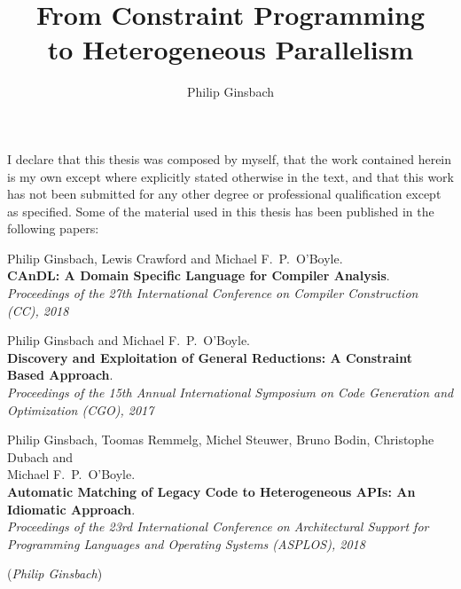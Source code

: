 \documentclass[phd,icsa,twoside,logo,11pt]{infthesis}
\title{From Constraint Programming\\to Heterogeneous Parallelism}
\author{Philip Ginsbach}
\begin{document}
\begin{preliminary}
\maketitle
\begin{acknowledgements}
\end{acknowledgements}
\begin{declaration}
    I declare that this thesis was composed by myself, that the work contained
    herein is my own except where explicitly stated otherwise in the text, and
    that this work has not been submitted for any other degree or professional
    qualification except as specified.
    Some of the material used in this thesis has been published in the following
    papers:

    \begin{description}
    \small
        \item[\hspace{0.35cm}\citep{Ginsbach:2018:CDS:3178372.3179515}]
              Philip Ginsbach, Lewis Crawford and Michael F.\ P.\ O'Boyle.\\
              {\bf CAnDL: A Domain Specific Language for Compiler Analysis}.\\
              {\em Proceedings of the 27th International Conference on
               Compiler Construction (CC), 2018}
        \item[\hspace{0.35cm}\citep{ginsbach2017discovery}]
              Philip Ginsbach and Michael F.\ P.\ O'Boyle.\\
              {\bf Discovery and Exploitation of General Reductions: A
              Constraint Based Approach}.\\
              {\em Proceedings of the 15th Annual International
               Symposium on Code Generation and\\Optimization (CGO), 2017}
        \item[\hspace{0.35cm}\citep{Ginsbach:2018:AML:3173162.3173182}]
              Philip Ginsbach, Toomas Remmelg, Michel Steuwer, Bruno Bodin,
              Christophe Dubach and\\Michael F.\ P.\ O'Boyle.\\
              {\bf Automatic Matching of Legacy Code to Heterogeneous APIs: An
              Idiomatic Approach}.\\
              {\em Proceedings of the 23rd International Conference on
               Architectural Support for\\Programming Languages and Operating
               Systems (ASPLOS), 2018}
    \end{description}

    \par
\vspace{1in}\raggedleft({\em Philip Ginsbach})
\end{declaration}
\tableofcontents
\end{preliminary}
\end{document}
